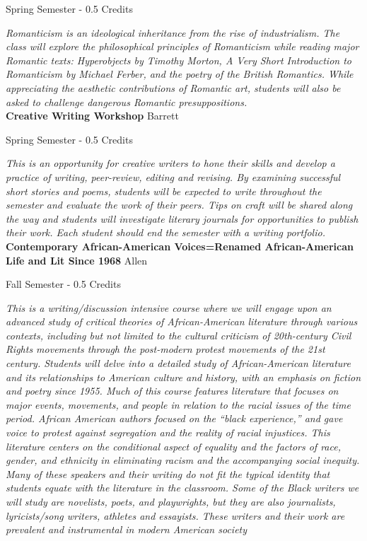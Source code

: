 \noindent Spring Semester - 0.5 Credits

\vspace{1mm}\emph{Romanticism is an ideological inheritance from the rise of industrialism.  The class will explore the philosophical principles of Romanticism while reading major Romantic texts: Hyperobjects by Timothy Morton, A Very Short Introduction to Romanticism by Michael Ferber, and the poetry of the British Romantics.  While appreciating the aesthetic contributions of Romantic art, students will also be asked to challenge dangerous Romantic presuppositions.  }\\


\noindent\textbf{Creative Writing Workshop} \hfill Barrett

\noindent Spring Semester - 0.5 Credits

\vspace{1mm}\emph{This is an opportunity for creative writers to hone their skills and develop a practice of writing, peer-review, editing and revising.  By examining successful short stories and poems, students will be expected to write throughout the semester and evaluate the work of their peers.  Tips on craft will be shared along the way and students will investigate literary journals for opportunities to publish their work.  Each student should end the semester with a writing portfolio.    }\\


\noindent\textbf{Contemporary African-American Voices=Renamed African-American Life and Lit Since 1968} \hfill Allen

\noindent Fall Semester - 0.5 Credits

\vspace{1mm}\emph{This is a writing/discussion intensive course where we will engage upon an advanced study of critical theories of African-American literature through various contexts, including but not limited to the cultural criticism of 20th-century Civil Rights movements through the post-modern protest movements of the 21st century. Students will delve into a detailed study of African-American literature and its relationships to American culture and history, with an emphasis on fiction and poetry since 1955. Much of this course features literature that focuses on major events, movements, and people in relation to the racial issues of the time period. African American authors focused on the “black experience,” and gave voice to protest against segregation and the reality of racial injustices. This literature centers on the conditional aspect of equality and the factors of race, gender, and ethnicity in eliminating racism and the accompanying social inequity. Many of these speakers and their writing do not fit the typical identity that students equate with the literature in the classroom. Some of the Black writers we will study are novelists, poets, and playwrights, but they are also journalists, lyricists/song writers, athletes and essayists. These writers and their work are prevalent and instrumental in modern American society}\\


